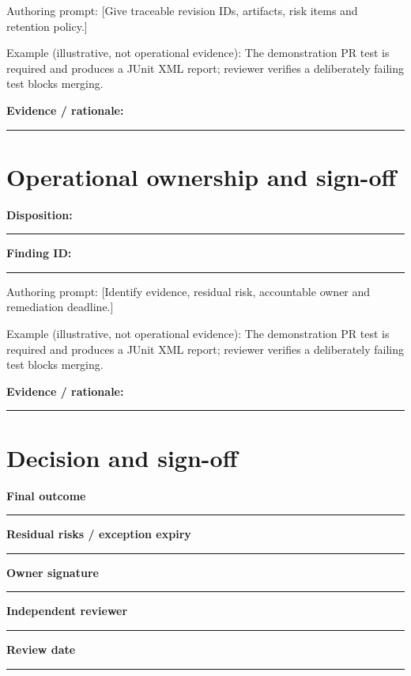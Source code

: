 \documentclass[11pt,letterpaper]{article}
\begin{document}
Authoring prompt: [Give traceable revision IDs, artifacts, risk items and retention policy.]

Example (illustrative, not operational evidence): The demonstration PR test is required and produces a JUnit XML report; reviewer verifies a deliberately failing test blocks merging.

\noindent\textbf{Evidence / rationale:}\par\nobreak\vspace{8pt}\noindent\rule{0.93\linewidth}{0.4pt}\par\vspace{14pt}
\section{Operational ownership and sign-off}
\noindent\textbf{Disposition:}\rule{2.5cm}{0.4pt}\quad\textbf{Finding ID:}\rule{4cm}{0.4pt}

Authoring prompt: [Identify evidence, residual risk, accountable owner and remediation deadline.]

Example (illustrative, not operational evidence): The demonstration PR test is required and produces a JUnit XML report; reviewer verifies a deliberately failing test blocks merging.

\noindent\textbf{Evidence / rationale:}\par\nobreak\vspace{8pt}\noindent\rule{0.93\linewidth}{0.4pt}\par\vspace{14pt}
\section{Decision and sign-off}
\noindent\textbf{Final outcome}\par\nobreak\vspace{6pt}\noindent\rule{0.93\linewidth}{0.4pt}\par\vspace{14pt}
\noindent\textbf{Residual risks / exception expiry}\par\nobreak\vspace{6pt}\noindent\rule{0.93\linewidth}{0.4pt}\par\vspace{14pt}
\noindent\textbf{Owner signature}\par\nobreak\vspace{6pt}\noindent\rule{0.93\linewidth}{0.4pt}\par\vspace{14pt}
\noindent\textbf{Independent reviewer}\par\nobreak\vspace{6pt}\noindent\rule{0.93\linewidth}{0.4pt}\par\vspace{14pt}
\noindent\textbf{Review date}\par\nobreak\vspace{6pt}\noindent\rule{0.93\linewidth}{0.4pt}\par\vspace{14pt}
\end{document}
